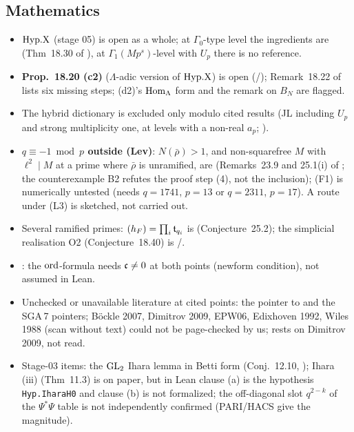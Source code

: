 \subsection{Mathematics}
\begin{itemize}
\item \textbf{$\mathrm{Hyp.X}$} (stage 05) is open as a whole; at $\Gamma_0$-type level the ingredients are \stcited{} (Thm~18.30 of \mainpdf), at $\Gamma_1(Mp^s)$-level with $U_p$ there is no reference.
\item \textbf{Prop.~18.20 (c2)} ($\Lambda$-adic version of $\mathrm{Hyp.X}$) is open (\stconj/\stopen); Remark~18.22 of \mainpdf{} lists
  six missing steps; (d2)'s $\operatorname{Hom}_\Lambda$ form and the remark on $B_N$ are flagged.
\item The hybrid dictionary is excluded only modulo cited results (JL including $U_p$ and strong multiplicity one, at levels
  with a non-real $a_p$; \stpmc).
\item \textbf{$q\equiv-1\bmod p$ outside (Lev)}: $N(\bar\rho)>1$, and non-squarefree $M$ with $\ell^2\mid M$ at a prime where $\bar\rho$ is unramified, are \stopen{} (Remarks~23.9 and 25.1(i) of \mainpdf; the counterexample B2 refutes the proof
  step (4), not the inclusion); (F1) is numerically untested (needs $q=1741$, $p=13$ or $q=2311$, $p=17$). A route under
  (L3) is sketched, not carried out.
\item Several ramified primes: $(h_F)=\prod_i\mathfrak{t}_{q_i}$ is \stconj{} (Conjecture~25.2);
  the simplicial realisation O2 (Conjecture~18.40) is \stconj/\stopen.
\item {}: the $\mathrm{ord}$-formula needs $\mathfrak{c}\ne0$ at both points (newform condition), not assumed in Lean.
\item Unchecked or unavailable literature at cited points: the pointer to \cite[Thm~14.4]{JL} and the SGA\,7 pointers;
  B\"ockle 2007, Dimitrov 2009, EPW06, Edixhoven 1992, Wiles 1988 (scan without text) could not be page-checked by us;
  \cite[Lemma~2.4]{KO} rests on Dimitrov 2009, not read.
\item Stage-03 items: the $\mathrm{GL}_2$ Ihara lemma in Betti form (Conj.~12.10, \stexp); Ihara (iii) (Thm~11.3) is \stpmc{} on paper, but in Lean clause (a) is the hypothesis \texttt{Hyp.IharaH0} and clause (b) is not formalized; the off-diagonal slot
  $q^{2-k}$ of the $\Psi^*\Psi$ table is not independently confirmed (PARI/HACS give the magnitude).
\end{itemize}

